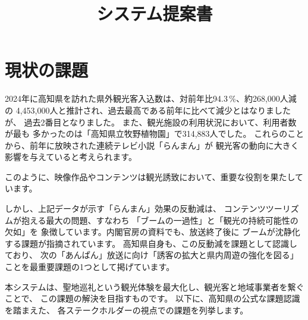 \documentclass{docs}
\title{システム提案書}
\begin{document}
\section{現状の課題}\label{sec:issues}
2024年に高知県を訪れた県外観光客入込数は、対前年比94.3\,\%、約268,000人減の
4,453,000人と推計され、過去最高である前年に比べて減少とはなりましたが、
過去2番目となりました。
また、観光施設の利用状況において、利用者数が最も
多かったのは「高知県立牧野植物園」で314,883人でした\cite{kochi_tourism_stat}。
これらのことから、前年に放映された連続テレビ小説「らんまん」が
観光客の動向に大きく影響を与えていると考えられます。

このように、映像作品やコンテンツは観光誘致において、重要な役割を果たしています。

しかし、上記データが示す「らんまん」効果の反動減は、
コンテンツツーリズムが抱える最大の問題、すなわち
「ブームの一過性」と「観光の持続可能性の欠如」を
象徴しています。内閣官房の資料\cite{cas_kadokawa}でも、放送終了後に
ブームが沈静化する課題が指摘されています。
高知県自身も、この反動減を課題として認識しており、
次の「あんぱん」放送に向け「誘客の拡大と県内周遊の強化を図る」
ことを最重要課題の1つとして掲げています\cite{kochi_r7_plan}。

本システムは、聖地巡礼という観光体験を最大化し、観光客と地域事業者を繋ぐことで、
この課題の解決を目指すものです。
以下に、高知県の公式な課題認識\cite{kochi_dx_plan}を踏まえた、
各ステークホルダーの視点での課題を列挙します。
\end{document}
